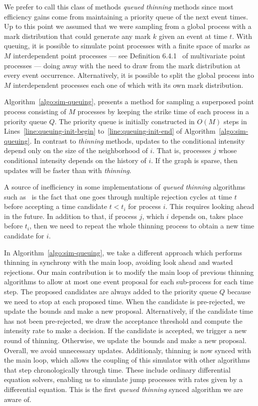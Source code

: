 \documentclass{juliacon}
\numberwithin{equation}{section}
\begin{document}
We prefer to call this class of methods \textit{queued thinning} methods since most efficiency gains come from maintaining a priority queue of the next event times. Up to this point we assumed that we were sampling from a global process with a mark distribution that could generate any mark \( k \) given an event at time \( t \). With queuing, it is possible to simulate point processes with a finite space of marks as \( M \) interdependent point processes --- see Definition 6.4.1~\cite{daley2003} of multivariate point processes --- doing away with the need to draw from the mark distribution at every event occurrence. Alternatively, it is possible to split the global process into \( M \) interdependent processes each one of which with its own mark distribution.

Algorithm~\ref{algo:sim-queuing}, presents a method for sampling a superposed point process consisting of \( M \) processes by keeping the strike time of each process in a priority queue \( Q \). The priority queue is initially constructed in \( O(M) \) steps in Lines~\ref{line:queuing-init-begin} to~\ref{line:queuing-init-end} of Algorithm~\ref{algo:sim-queuing}. In contrast to \textit{thinning} methods, updates to the conditional intensity depend only on the size of the neighborhood of \( i \). That is, processes \( j \) whose conditional intensity depends on the history of \( i \). If the graph is sparse, then updates will be faster than with \textit{thinning}.

A source of inefficiency in some implementations of \textit{queued thinning} algorithms such as~\cite{farajtabar2017} is the fact that one goes through multiple rejection cycles at time \( t \) before accepting a time candidate \( t < t_i \) for process \( i \). This requires looking ahead in the future. In addition to that, if process \( j \), which \( i \) depends on, takes place before \( t_i \), then we need to repeat the whole thinning process to obtain a new time candidate for \( i \).

In Algorithm~\ref{algo:sim-queuing}, we take a different approach which performs thinning in synchrony with the main loop, avoiding look ahead and wasted rejections. Our main contribution is to modify the main loop of previous thinning algorithms to allow at most one event proposal for each sub-process for each time step. The proposed candidates are always added to the priority queue \( Q \) because we need to stop at each proposed time. When the candidate is pre-rejected, we update the bounds and make a new proposal. Alternatively, if the candidate time has not been pre-rejected, we draw the acceptance threshold and compute the intensity rate to make a decision. If the candidate is accepted, we trigger a new round of thinning. Otherwise, we update the bounds and make a new proposal. Overall, we avoid unnecessary updates. Additionaly, thinning is now synced with the main loop, which allows the coupling of this simulator with other algorithms that step chronologically through time. These include ordinary differential equation solvers, enabling us to simulate jump processes with rates given by a differential equation. This is the first \textit{queued thinning} synced algorithm we are aware of.
\end{document}
